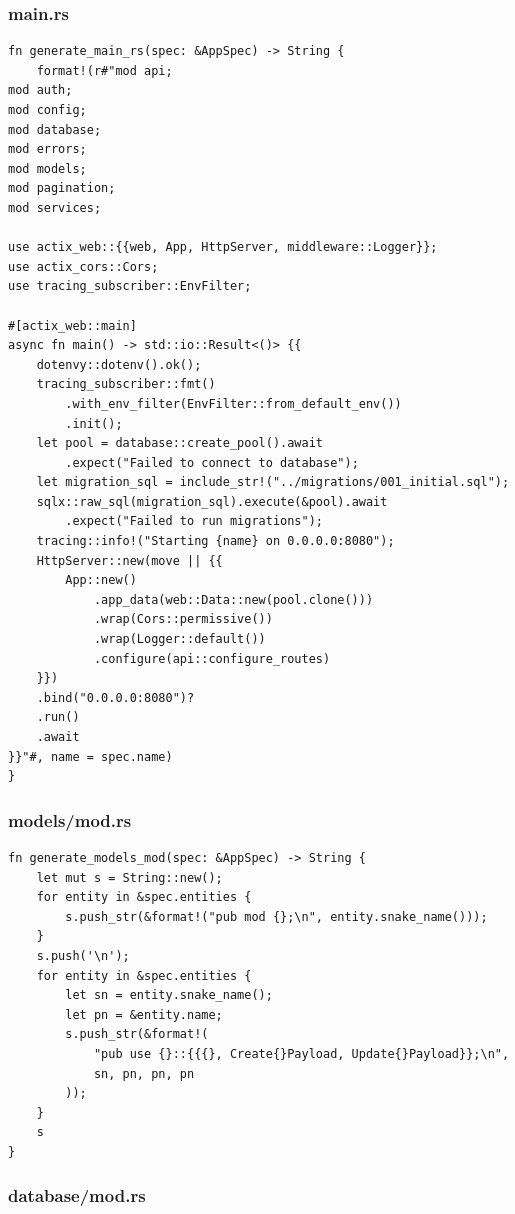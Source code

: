 \documentclass[11pt,a4paper]{article}
\begin{document}
\subsubsection{main.rs}

\begin{lstlisting}
fn generate_main_rs(spec: &AppSpec) -> String {
    format!(r#"mod api;
mod auth;
mod config;
mod database;
mod errors;
mod models;
mod pagination;
mod services;

use actix_web::{{web, App, HttpServer, middleware::Logger}};
use actix_cors::Cors;
use tracing_subscriber::EnvFilter;

#[actix_web::main]
async fn main() -> std::io::Result<()> {{
    dotenvy::dotenv().ok();
    tracing_subscriber::fmt()
        .with_env_filter(EnvFilter::from_default_env())
        .init();
    let pool = database::create_pool().await
        .expect("Failed to connect to database");
    let migration_sql = include_str!("../migrations/001_initial.sql");
    sqlx::raw_sql(migration_sql).execute(&pool).await
        .expect("Failed to run migrations");
    tracing::info!("Starting {name} on 0.0.0.0:8080");
    HttpServer::new(move || {{
        App::new()
            .app_data(web::Data::new(pool.clone()))
            .wrap(Cors::permissive())
            .wrap(Logger::default())
            .configure(api::configure_routes)
    }})
    .bind("0.0.0.0:8080")?
    .run()
    .await
}}"#, name = spec.name)
}
\end{lstlisting}

\subsubsection{models/mod.rs}

\begin{lstlisting}
fn generate_models_mod(spec: &AppSpec) -> String {
    let mut s = String::new();
    for entity in &spec.entities {
        s.push_str(&format!("pub mod {};\n", entity.snake_name()));
    }
    s.push('\n');
    for entity in &spec.entities {
        let sn = entity.snake_name();
        let pn = &entity.name;
        s.push_str(&format!(
            "pub use {}::{{{}, Create{}Payload, Update{}Payload}};\n",
            sn, pn, pn, pn
        ));
    }
    s
}
\end{lstlisting}

\subsubsection{database/mod.rs}
\end{document}
